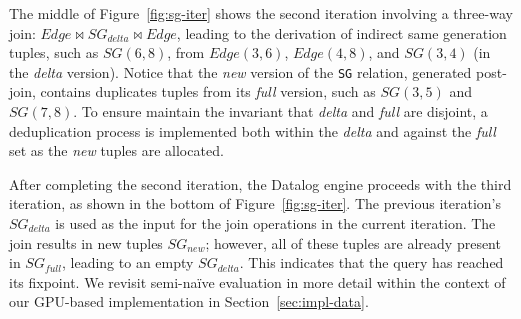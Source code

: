 \documentclass[nonacm,sigplan]{acmart}
\newcommand{\kris}[1]{{\textcolor{red}{\{\textbf{Kris}: #1\}}}}
\begin{document}
The middle of Figure~\ref{fig:sg-iter} shows the second iteration involving a three-way join: $\textit{Edge} \bowtie \textit{SG}_{delta} \bowtie \textit{Edge}$, leading to the derivation of indirect same generation tuples, such as $\textit{SG}(6,8)$, from $\textit{Edge}(3,6)$, $\textit{Edge}(4,8)$, and $\textit{SG}(3,4)$ (in the \textit{delta} version). Notice that the \textit{new} version of the \texttt{SG} relation, generated post-join, contains duplicates tuples from its \textit{full} version, such as $\textit{SG}(3,5)$ and $\textit{SG}(7,8)$.
To ensure maintain the invariant that \textit{delta} and \textit{full} are disjoint, a deduplication process is implemented both within the \textit{delta} and against the \textit{full} set as the \textit{new} tuples are allocated. 



After completing the second iteration, the Datalog engine proceeds with the third iteration, as shown in the bottom of Figure~\ref{fig:sg-iter}. The previous iteration's $\textit{SG}_\textit{delta}$ is used as the input for the join operations in the current iteration. The join results in new tuples $\textit{SG}_{new}$; however, all of these tuples are already present in $\textit{SG}_{full}$, leading to an empty $\textit{SG}_{delta}$. This indicates that the query has reached its fixpoint.  We revisit semi-na\"ive evaluation in more detail within the context of our GPU-based implementation in Section~\ref{sec:impl-data}.

\end{document}
